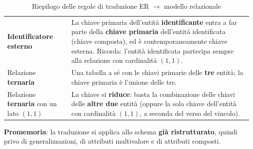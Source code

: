 \documentclass[a4paper,twoside]{article}
\begin{document}
\begin{table}[H]
\begin{tabular}{@{}p{}p{}@{}}
    \addlinespace
    \textbf{Identificatore esterno}
      & La chiave primaria dell'entità \textbf{identificante} entra a far parte della
        \textbf{chiave primaria} dell'entità identificata (chiave composta), ed è
        contemporaneamente chiave esterna. Ricorda: l'entità identificata partecipa
        sempre alla relazione con cardinalità \( (1,1) \). \\
    \addlinespace
    Relazione \textbf{ternaria}
      & Una tabella a sé con le chiavi primarie delle \textbf{tre} entità; la chiave
        primaria è l'unione delle tre. \\
    \addlinespace
    Relazione \textbf{ternaria} con un lato \( (1,1) \)
      & La chiave si \textbf{riduce}: basta la combinazione delle chiavi delle
        \textbf{altre due} entità (oppure la sola chiave dell'entità con
        cardinalità \( (1,1) \), a seconda del verso del vincolo). \\
    \bottomrule
  \end{tabular}
  \caption{Riepilogo delle regole di traduzione ER \( \to \) modello relazionale}
\end{table}

\noindent
\textbf{Promemoria}: la traduzione si applica allo schema \textbf{già ristrutturato},
quindi privo di generalizzazioni, di attributi multivalore e di attributi composti.
\end{document}
